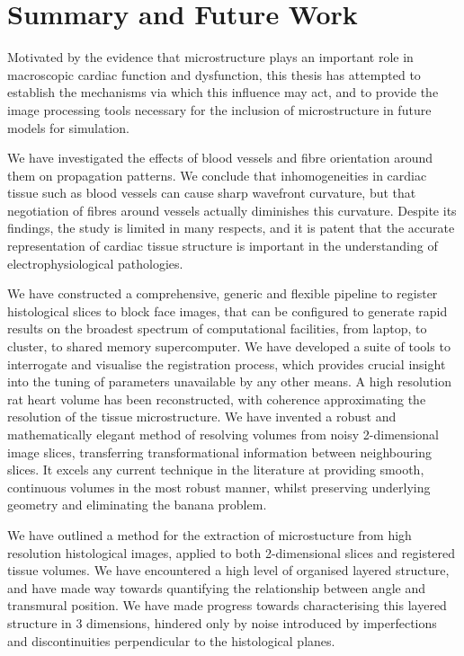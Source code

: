 \chapter{Summary and Future Work}
\dblspace
  Motivated by the evidence that microstructure plays an important role in macroscopic cardiac function and dysfunction, this thesis has attempted to establish the mechanisms via which this influence may act, and to provide the image processing tools necessary for the inclusion of microstructure in future models for simulation.
  
  We have investigated the effects of blood vessels and fibre orientation around them on propagation patterns. We conclude that inhomogeneities in cardiac tissue such as blood vessels can cause sharp wavefront curvature, but that negotiation of fibres around vessels actually diminishes this curvature. Despite its findings, the study is limited in many respects, and it is patent that the accurate representation of cardiac tissue structure is important in the understanding of electrophysiological pathologies.
  
  We have constructed a comprehensive, generic and flexible pipeline to register histological slices to block face images, that can be configured to generate rapid results on the broadest spectrum of computational facilities, from laptop, to cluster, to shared memory supercomputer. We have developed a suite of tools to interrogate and visualise the registration process, which provides crucial insight into the tuning of parameters unavailable by any other means. A high resolution rat heart volume has been reconstructed, with coherence approximating the resolution of the tissue microstructure. We have invented a robust and mathematically elegant method of resolving volumes from noisy 2-dimensional image slices, transferring transformational information between neighbouring slices. It excels any current technique in the literature at providing smooth, continuous volumes in the most robust manner, whilst preserving underlying geometry and eliminating the banana problem.
  
  We have outlined a method for the extraction of microstucture from high resolution histological images, applied to both 2-dimensional slices and registered tissue volumes. We have encountered a high level of organised layered structure, and have made way towards quantifying the relationship between angle and transmural position. We have made progress towards characterising this layered structure in 3 dimensions, hindered only by noise introduced by imperfections and discontinuities perpendicular to the histological planes.
  
